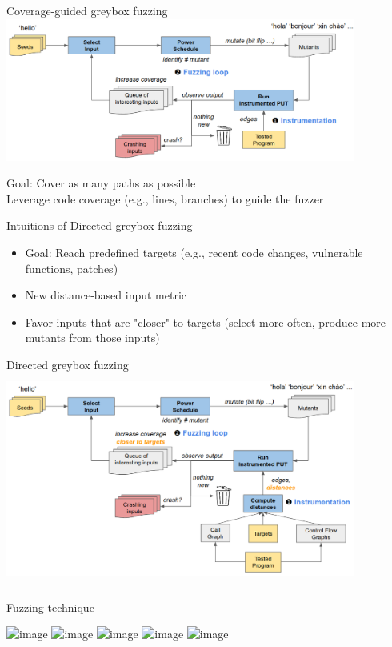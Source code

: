 \documentclass{beamer}
\begin{document}
\begin{frame}{Coverage-guided greybox fuzzing}
\includegraphics[width=11.5cm]{Figures/Fuzzing/graph2.png}

\centering Goal: Cover as many paths as possible\\
\centering Leverage code coverage (e.g., lines, branches) to guide the fuzzer
\end{frame}

\begin{frame}{Intuitions of Directed greybox fuzzing}
\begin{itemize}
	\item Goal: Reach predefined targets (e.g., recent code changes, vulnerable functions, patches)
	\item New distance-based input metric
	\item Favor inputs that are "closer" to targets (select more often, produce more mutants from those inputs)
\end{itemize}
\end{frame}

\begin{frame}{Directed greybox fuzzing}
\includegraphics[width=11.5cm,height=7cm]{Figures/Fuzzing/graph3.png}

\end{frame}

\begin{frame}{Fuzzing technique}

\includegraphics<1>[scale=0.3]{Figures/Fuzzing/1.png}
\includegraphics<2>[scale=0.3]{Figures/Fuzzing/2.png}
\includegraphics<3>[scale=0.3]{Figures/Fuzzing/3.png}
\includegraphics<4>[scale=0.3]{Figures/Fuzzing/4.png}
\includegraphics<5>[scale=0.3]{Figures/Fuzzing/5.png}

\end{frame}
\end{document}

